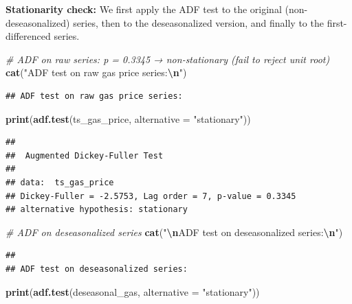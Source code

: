 \documentclass[
]{article}
\newenvironment{Shaded}{\begin{snugshade}}{\end{snugshade}}
\newcommand{\AttributeTok}[1]{\textcolor[rgb]{0.13,0.29,0.53}{#1}}
\newcommand{\CommentTok}[1]{\textcolor[rgb]{0.56,0.35,0.01}{\textit{#1}}}
\newcommand{\FunctionTok}[1]{\textcolor[rgb]{0.13,0.29,0.53}{\textbf{#1}}}
\newcommand{\NormalTok}[1]{#1}
\newcommand{\SpecialCharTok}[1]{\textcolor[rgb]{0.81,0.36,0.00}{\textbf{#1}}}
\newcommand{\StringTok}[1]{\textcolor[rgb]{0.31,0.60,0.02}{#1}}
\begin{document}
\textbf{Stationarity check:} We first apply the ADF test to the original
(non-deseasonalized) series, then to the deseasonalized version, and
finally to the first-differenced series.

\begin{Shaded}
\begin{Highlighting}[]
\CommentTok{\# ADF on raw series: p = 0.3345 → non{-}stationary (fail to reject unit root)}
\FunctionTok{cat}\NormalTok{(}\StringTok{"ADF test on raw gas price series:}\SpecialCharTok{\textbackslash{}n}\StringTok{"}\NormalTok{)}
\end{Highlighting}
\end{Shaded}

\begin{verbatim}
## ADF test on raw gas price series:
\end{verbatim}

\begin{Shaded}
\begin{Highlighting}[]
\FunctionTok{print}\NormalTok{(}\FunctionTok{adf.test}\NormalTok{(ts\_gas\_price, }\AttributeTok{alternative =} \StringTok{"stationary"}\NormalTok{))}
\end{Highlighting}
\end{Shaded}

\begin{verbatim}
## 
##  Augmented Dickey-Fuller Test
## 
## data:  ts_gas_price
## Dickey-Fuller = -2.5753, Lag order = 7, p-value = 0.3345
## alternative hypothesis: stationary
\end{verbatim}

\begin{Shaded}
\begin{Highlighting}[]
\CommentTok{\# ADF on deseasonalized series}
\FunctionTok{cat}\NormalTok{(}\StringTok{"}\SpecialCharTok{\textbackslash{}n}\StringTok{ADF test on deseasonalized series:}\SpecialCharTok{\textbackslash{}n}\StringTok{"}\NormalTok{)}
\end{Highlighting}
\end{Shaded}

\begin{verbatim}
## 
## ADF test on deseasonalized series:
\end{verbatim}

\begin{Shaded}
\begin{Highlighting}[]
\FunctionTok{print}\NormalTok{(}\FunctionTok{adf.test}\NormalTok{(deseasonal\_gas, }\AttributeTok{alternative =} \StringTok{"stationary"}\NormalTok{))}
\end{Highlighting}
\end{Shaded}
\end{document}
